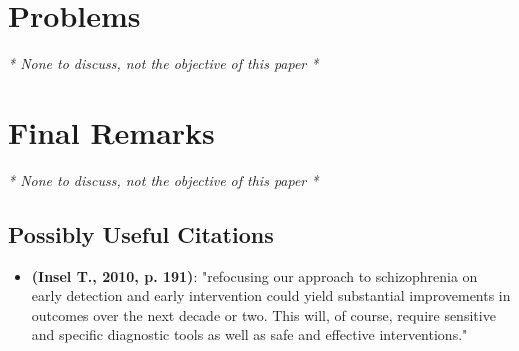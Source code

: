 \documentclass{Paper_Summary}
\begin{document}
\section{Problems}
\emph{* None to discuss, not the objective of this paper *}

\section{Final Remarks}
\emph{* None to discuss, not the objective of this paper *}

\breakline

\begin{center}
    \section*{Possibly Useful Citations}
\end{center}

    \begin{itemize}
        \item \textbf{(Insel T., 2010, p. 191)}: "refocusing our approach to schizophrenia on early detection and early intervention could yield substantial improvements in outcomes over the next decade or two. This will, of course, require sensitive and specific diagnostic tools as well as safe and effective interventions."
    \end{itemize}
\end{document}
